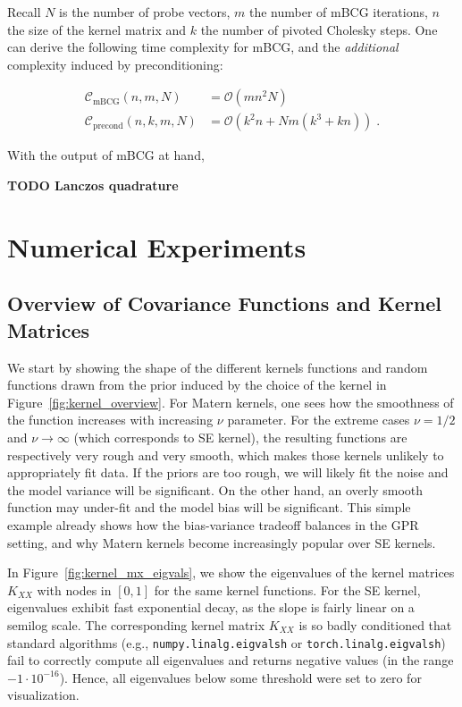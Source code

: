 \documentclass{article}
\begin{document}
Recall $N$ is the number of probe vectors, $m$ the number of mBCG iterations, $n$ the size of the kernel matrix and $k$ the number of pivoted Cholesky steps. One can derive the following time complexity for mBCG, and the \emph{additional} complexity induced by preconditioning:

\begin{align*}
    \mathcal C_{\text{mBCG}}(n, m, N) &= \mathcal O(mn^2N) \\
    \mathcal C_{\text{precond}}(n, k, m, N) &= \mathcal O(k^2 n + Nm(k^3 + kn)) \; .
\end{align*}

With the output of mBCG at hand, 

\textbf{TODO Lanczos quadrature}



\section{Numerical Experiments}

\subsection{Overview of Covariance Functions and Kernel Matrices}

We start by showing the shape of the different kernels functions and random functions drawn from the prior induced by the choice of the kernel in Figure~\ref{fig:kernel_overview}. For Matern kernels, one sees how the smoothness of the function increases with increasing $\nu$ parameter. For the extreme cases $\nu = 1/2$ and $\nu \to \infty$ (which corresponds to SE kernel), the resulting functions are respectively very rough and very smooth, which makes those kernels unlikely to appropriately fit data. If the priors are too rough, we will likely fit the noise and the model variance will be significant. On the other hand, an overly smooth function may under-fit and the model bias will be significant. This simple example already shows how the bias-variance tradeoff balances in the GPR setting, and why Matern kernels become increasingly popular over SE kernels. 

In Figure~\ref{fig:kernel_mx_eigvals}, we show the eigenvalues of the kernel matrices $K_{XX}$ with nodes in $[0, 1]$ for the same kernel functions. For the SE kernel, eigenvalues exhibit fast exponential decay, as the slope is fairly linear on a semilog scale. The corresponding kernel matrix $K_{XX}$ is so badly conditioned that standard algorithms (e.g., \texttt{numpy.linalg.eigvalsh} or \texttt{torch.linalg.eigvalsh}) fail to correctly compute all eigenvalues and returns negative values (in the range $-1 \cdot 10^{-16}$). Hence, all eigenvalues below some threshold were set to zero for visualization. 
\end{document}
